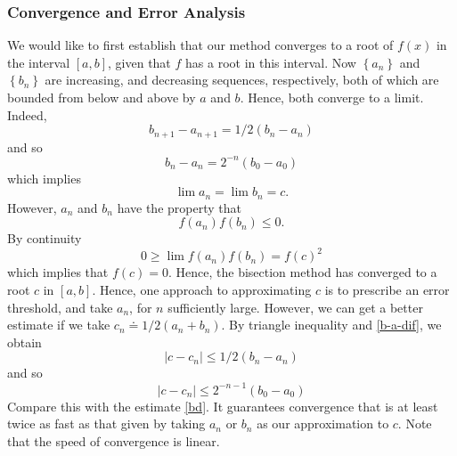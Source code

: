 \documentclass[12pt]{article}
\theoremstyle{plain}
\theoremstyle{definition}
\theoremstyle{remark}
\numberwithin{equation}{section}  %
\begin{document}
\subsubsection*{Convergence and Error Analysis} 
We would like to first establish that our method converges to a root of
$f(x)$ in the interval $[a,b]$, given that $f$ has a root in this interval.
Now $ \left\{ a_n \right\} $ and $ \left\{ b_n \right\}  $ 
are increasing, and decreasing sequences, respectively, both of which
are bounded from below and above by $a$ and $b$. Hence, both converge
to a limit. Indeed,
\begin{equation}
\label{b-a-dif}
 b_{n+1} - a_{n+1} = 1/2(b_n - a_n)
\end{equation}
and so
\begin{equation}
\label{bd}
b_{n} - a_{n} = 2^{-n}(b_0 - a_0)
\end{equation}
which implies
\begin{equation*}
\lim a_n = \lim b_{n} = c.
\end{equation*}
However, $a_n$ and $b_n$ have the property that
\begin{equation*}
f(a_n)f(b_n) \le 0.
\end{equation*}
By continuity
\begin{equation*}
0 \ge \lim f(a_n)f(b_n) = f(c)^2
\end{equation*}
which implies that $f(c) = 0$. Hence, the bisection method has converged to a root
$c$ in $[a,b]$.
Hence, one approach to approximating $c$ is to prescribe an error threshold, and
take $a_n$, for $n$ sufficiently large. However, we can get a better estimate
if we take $c_n \doteq 1/2(a_n + b_n)$. By triangle inequality and \eqref{b-a-dif}, we obtain
\begin{equation*}
|c - c_n| \le 1/2 (b_n - a_n)
\end{equation*}
and so
\begin{equation*}
|c - c_n| \le 2^{-n - 1}(b_0 - a_0)
\end{equation*}
Compare this with the estimate \eqref{bd}. It guarantees convergence
that is at least twice as fast as that given by taking $a_n$ or $b_n$
as our approximation to $c$. Note that the speed of convergence is linear.
\end{document}
